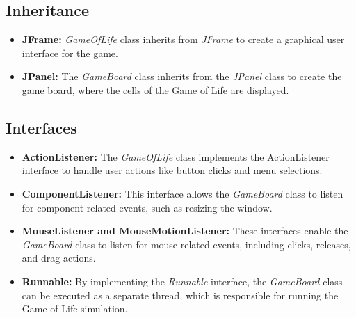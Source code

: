 \documentclass[12pt]{article}
\begin{document}
  \subsection*{Inheritance}
  \begin{itemize}
    \item \textbf{JFrame:} \textit{GameOfLife} class inherits from \textit{JFrame} to create a graphical user interface for the game.
    \item \textbf{JPanel:} The \textit{GameBoard} class inherits from the \textit{JPanel} class to create the game board, where the cells of the Game of Life are displayed.
  \end{itemize}

  \subsection*{Interfaces}
  \begin{itemize}
    \item \textbf{ActionListener:} The \textit{GameOfLife} class implements the ActionListener interface to handle user actions like button clicks and menu selections.
    \item \textbf{ComponentListener:} This interface allows the \textit{GameBoard} class to listen for component-related events, such as resizing the window.
    \item \textbf{MouseListener and MouseMotionListener:} These interfaces enable the \textit{GameBoard} class to listen for mouse-related events, including clicks, releases, and drag actions. 
    \item \textbf{Runnable:} By implementing the \textit{Runnable} interface, the \textit{GameBoard} class can be executed as a separate thread, which is responsible for running the Game of Life simulation.
  \end{itemize}
\end{document}
